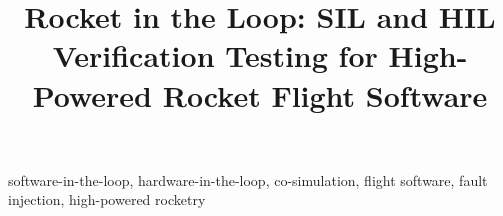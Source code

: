 \documentclass[10pt,conference]{IEEEtran}
\begin{document}
\title{Rocket in the Loop: SIL and HIL Verification Testing for High-Powered Rocket Flight Software}

\author{
\and
{}
}
\maketitle

\begin{abstract}

\end{abstract}

\begin{IEEEkeywords}
software-in-the-loop, hardware-in-the-loop, co-simulation, flight software, fault injection, high-powered rocketry
\end{IEEEkeywords}












\end{document}
